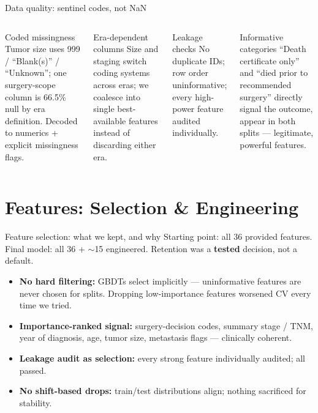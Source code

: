 \documentclass[aspectratio=169,10pt]{beamer}
\begin{document}
\begin{frame}{Data quality: sentinel codes, not NaN}
  \begin{columns}[t]
    \begin{block}{Coded missingness}\scriptsize
      Tumor size uses 999 / ``Blank(s)'' / ``Unknown''; one surgery-scope column is 66.5\% null
      by era definition. Decoded to numerics + explicit missingness flags.
    \end{block}
    \begin{block}{Era-dependent columns}\scriptsize
      Size and staging switch coding systems across eras; we coalesce into single
      best-available features instead of discarding either era.
    \end{block}
    \begin{block}{Leakage checks}\scriptsize
      No duplicate IDs; row order uninformative; every high-power feature audited individually.
    \end{block}
    \begin{block}{Informative categories}\scriptsize
      ``Death certificate only'' and ``died prior to recommended surgery'' directly signal
      the outcome, appear in both splits --- legitimate, powerful features.
    \end{block}
  \end{columns}
\end{frame}

\section{Features: Selection \& Engineering}

\begin{frame}{Feature selection: what we kept, and why}
  Starting point: all 36 provided features. Final model: all 36 + $\sim$15 engineered.
  Retention was a \textbf{tested} decision, not a default.
  \begin{itemize}
    \item \textbf{No hard filtering:} GBDTs select implicitly --- uninformative features are never
          chosen for splits. Dropping low-importance features worsened CV every time we tried.
    \item \textbf{Importance-ranked signal:} surgery-decision codes, summary stage / TNM,
          year of diagnosis, age, tumor size, metastasis flags --- clinically coherent.
    \item \textbf{Leakage audit as selection:} every strong feature individually audited; all passed.
    \item \textbf{No shift-based drops:} train/test distributions align; nothing sacrificed for stability.
  \end{itemize}
\end{frame}
\end{document}

